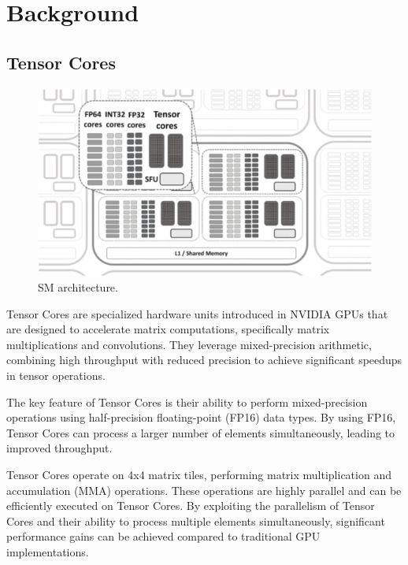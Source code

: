 \documentclass[conference]{IEEEtran}
\begin{document}
  \section{Background}\label{sec:background}
  
  \subsection{Tensor Cores}\label{sec:tensor-cores}
  
  \begin{figure}[htbp]
    \centering
    \includegraphics[scale=0.32]{figures/SM.png}
    \caption{SM architecture.\cite{NVIDIA_Tensor_Core_Programmability_KTH}}
    \label{fig:performance-comparison}
  \end{figure}

  Tensor Cores are specialized hardware units introduced in NVIDIA GPUs that are designed to accelerate matrix computations, 
  specifically matrix multiplications and convolutions. They leverage mixed-precision arithmetic, 
  combining high throughput with reduced precision to achieve significant speedups in tensor operations.
  
  The key feature of Tensor Cores is their ability to perform mixed-precision operations using 
  half-precision floating-point (FP16) data types. By using FP16, Tensor Cores can process a larger 
  number of elements simultaneously, leading to improved throughput. 
  
  Tensor Cores operate on 4x4 matrix tiles, performing matrix multiplication and accumulation (MMA) 
  operations. These operations are highly parallel and can be efficiently executed on Tensor Cores. 
  By exploiting the parallelism of Tensor Cores and their ability to process multiple elements 
  simultaneously, significant performance gains can be achieved compared to traditional GPU 
  implementations.
  
\end{document}
